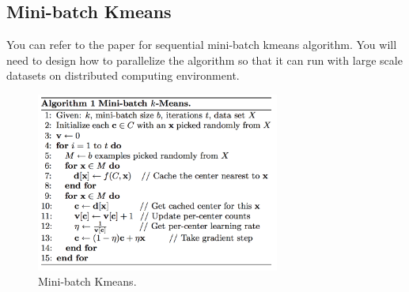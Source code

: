 \subsection*{Mini-batch Kmeans}
You can refer to the paper for sequential mini-batch
kmeans algorithm. You will need to design how to parallelize the algorithm so
that it can run with large scale datasets on distributed computing environment.

\begin{figure}[H]
\includegraphics[width=8cm]{section/icloud/assignment/problems/project8/mbkmeans}
\centering
\caption{Mini-batch Kmeans.}
\end{figure}  
